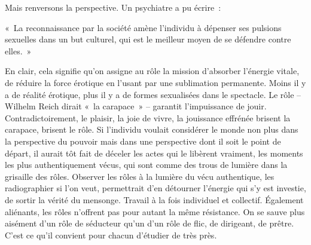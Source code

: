 \documentclass[french,twoside]{book} %
\newenvironment{quoteblock}%
  {\begin{quoting}}
  {\end{quoting}}
\newenvironment{quotebar}{%
    \def\FrameCommand{{\color{rubric!10!}\vrule width 0.5em} \hspace{0.9em}}%
    \def\OuterFrameSep{\itemsep} %
    \MakeFramed {\advance\hsize-\width \FrameRestore}
  }%
  {%
    \endMakeFramed
  }
\renewenvironment{quoteblock}%
  {%
    \savenotes
    \setstretch{0.9}
    \normalfont
    \begin{quotebar}
  }
  {%
    \end{quotebar}
    \spewnotes
  }
\begin{document}
Mais renversons la perspective. Un psychiatre a pu écrire :\par

\begin{quoteblock}
\noindent « La reconnaissance par la société amène l’individu à dépenser ses pulsions sexuelles dans un but culturel, qui est le meilleur moyen de se défendre contre elles. »\end{quoteblock}

\noindent En clair, cela signifie qu’on assigne au rôle la mission d’absorber l’énergie vitale, de réduire la force érotique en l’usant par une sublimation permanente. Moins il y a de réalité érotique, plus il y a de formes sexualisées dans le spectacle. Le rôle – Wilhelm Reich dirait « la carapace » – garantit l’impuissance de jouir. Contradictoirement, le plaisir, la joie de vivre, la jouissance effrénée brisent la carapace, brisent le rôle. Si l’individu voulait considérer le monde non plus dans la perspective du pouvoir mais dans une perspective dont il soit le point de départ, il aurait tôt fait de déceler les actes qui le libèrent vraiment, les moments les plus authentiquement vécus, qui sont comme des trous de lumière dans la grisaille des rôles. Observer les rôles à la lumière du vécu authentique, les radiographier si l’on veut, permettrait d’en détourner l’énergie qui s’y est investie, de sortir la vérité du mensonge. Travail à la fois individuel et collectif. Également aliénants, les rôles n’offrent pas pour autant la même résistance. On se sauve plus aisément d’un rôle de séducteur qu’un d’un rôle de flic, de dirigeant, de prêtre. C’est ce qu’il convient pour chacun d’étudier de très près.
\end{document}
